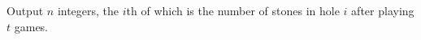 
Output $n$ integers, the $i$th of which is the number of stones in hole $i$ after playing $t$ games.
